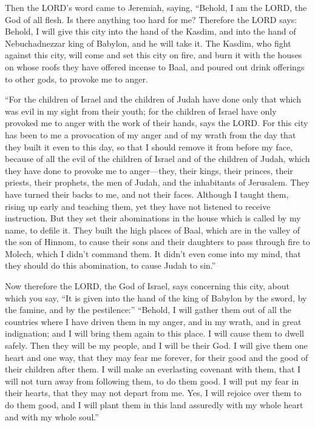 \myverse{}Then the LORD’s word came to Jeremiah, saying, \myverse{}“Behold, I am the LORD, the God of all flesh. Is there anything too hard for me? \myverse{}Therefore the LORD says: Behold, I will give this city into the hand of the Kasdim, and into the hand of Nebuchadnezzar king of Babylon, and he will take it. \myverse{}The Kasdim, who fight against this city, will come and set this city on fire, and burn it with the houses on whose roofs they have offered incense to Baal, and poured out drink offerings to other gods, to provoke me to anger.


\myverse{}“For the children of Israel and the children of Judah have done only that which was evil in my sight from their youth; for the children of Israel have only provoked me to anger with the work of their hands, says the LORD. \myverse{}For this city has been to me a provocation of my anger and of my wrath from the day that they built it even to this day, so that I should remove it from before my face, \myverse{}because of all the evil of the children of Israel and of the children of Judah, which they have done to provoke me to anger—they, their kings, their princes, their priests, their prophets, the men of Judah, and the inhabitants of Jerusalem. \myverse{}They have turned their backs to me, and not their faces. Although I taught them, rising up early and teaching them, yet they have not listened to receive instruction. \myverse{}But they set their abominations in the house which is called by my name, to defile it. \myverse{}They built the high places of Baal, which are in the valley of the son of Hinnom, to cause their sons and their daughters to pass through fire to Molech, which I didn’t command them. It didn’t even come into my mind, that they should do this abomination, to cause Judah to sin.”


\myverse{}Now therefore the LORD, the God of Israel, says concerning this city, about which you say, “It is given into the hand of the king of Babylon by the sword, by the famine, and by the pestilence:” \myverse{}“Behold, I will gather them out of all the countries where I have driven them in my anger, and in my wrath, and in great indignation; and I will bring them again to this place. I will cause them to dwell safely. \myverse{}Then they will be my people, and I will be their God. \myverse{}I will give them one heart and one way, that they may fear me forever, for their good and the good of their children after them. \myverse{}I will make an everlasting covenant with them, that I will not turn away from following them, to do them good. I will put my fear in their hearts, that they may not depart from me. \myverse{}Yes, I will rejoice over them to do them good, and I will plant them in this land assuredly with my whole heart and with my whole soul.”


